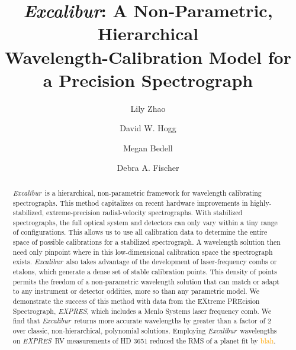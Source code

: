\documentclass[modern]{aastex63}
\newcommand{\project}[1]{\textsl{#1}}
\newcommand{\name}{\project{Excalibur}}
\newcommand{\acronym}[1]{{\small{#1}}}
\newcommand{\expres}{\project{\acronym{EXPRES}}}
\newcommand{\lz}[1]{\textcolor{orange}{#1}}
\begin{document}
\title{\name:
  A Non-Parametric, Hierarchical \\
  Wavelength-Calibration Model for a Precision Spectrograph}


\author[0000-0002-3852-3590]{Lily Zhao}

\author[0000-0003-2866-9403]{David W. Hogg}

\author[0000-0001-9907-7742]{Megan Bedell}

\author[0000-0003-2221-0861]{Debra A. Fischer}

\begin{abstract}\noindent%
\name\ is a hierarchical, non-parametric framework for wavelength calibrating spectrographs.  This method capitalizes on recent hardware improvements in highly-stabilized, extreme-precision radial-velocity spectrographs.  With stabilized spectrographs, the full optical system and detectors can only vary within a tiny range of configurations.  This allows us to use all calibration data to determine the entire space of possible calibrations for a stabilized spectrograph.  A wavelength solution then need only pinpoint where in this low-dimensional calibration space the spectrograph exists.  \name\ also takes advantage of the development of laser-frequency combs or etalons, which generate a dense set of stable calibration points.  This density of points permits the freedom of a non-parametric wavelength solution that can match or adapt to any instrument or detector oddities, more so than any parametric model.  We demonstrate the success of this method with data from the EXtreme PREcision Spectrograph, \expres, which includes a Menlo Systems laser frequency comb.  We find that \name\ returns more accurate wavelengths by greater than a factor of 2 over classic, non-hierarchical, polynomial solutions.  Employing \name\ wavelengths on \expres\ RV measurements of HD 3651 reduced the RMS of a planet fit by \lz{blah}.
\end{abstract}
\end{document}
